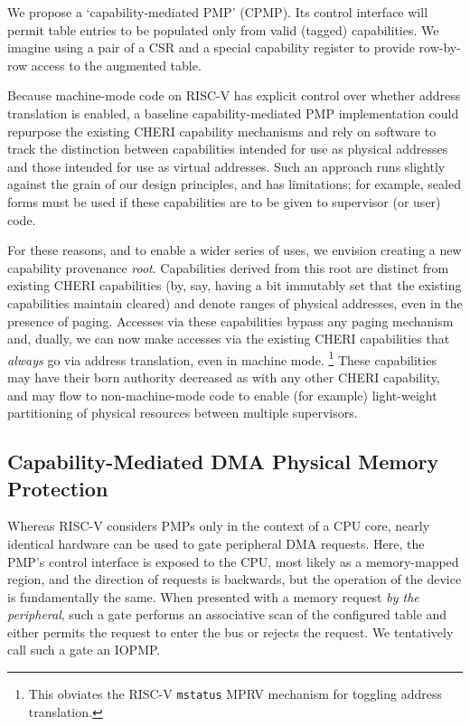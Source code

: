 We propose a `capability-mediated PMP' (CPMP).  Its control interface will
permit table entries to be populated only from valid (tagged) capabilities.
We imagine using a pair of a CSR and a special capability register to
provide row-by-row access to the augmented table.

Because machine-mode code on RISC-V has explicit control over whether
address translation is enabled, a baseline capability-mediated PMP
implementation could repurpose the existing CHERI capability mechanisms and
rely on software to track the distinction between capabilities intended for
use as physical addresses and those intended for use as virtual addresses.
Such an approach runs slightly against the grain of our design principles,
and has limitations; for example, sealed forms must be used if these
capabilities are to be given to supervisor (or user) code.

For these reasons, and to enable a wider series of uses, we envision creating
a new capability provenance \emph{root}.  Capabilities derived from this
root are distinct from existing CHERI capabilities (by, say, having a bit
immutably set that the existing capabilities maintain cleared) and denote
ranges of physical addresses, even in the presence of paging.  Accesses via
these capabilities bypass any paging mechanism and, dually, we can now make
accesses via the existing CHERI capabilities
that
 \emph{always} go via address translation, even in machine mode.%
%
\footnote{This obviates the RISC-V \texttt{mstatus} MPRV mechanism for
toggling address translation.}
%
These capabilities may have their born authority decreased as with any other
CHERI capability, and may flow to non-machine-mode code to enable (for
example) light-weight partitioning of physical resources between multiple
supervisors.

\subsection{Capability-Mediated DMA Physical Memory Protection} %

Whereas RISC-V considers PMPs only in the context of a CPU core, nearly
identical hardware can be used to gate peripheral DMA requests.  Here, the
PMP's control interface is exposed to the CPU, most likely as a
memory-mapped region, and the direction of requests is backwards, but the
operation of the device is fundamentally the same.  When presented with a
memory request \emph{by the peripheral}, such a gate performs an associative
scan of the configured table and either permits the request to enter the bus
or rejects the request.  We tentatively call such a gate an IOPMP.

